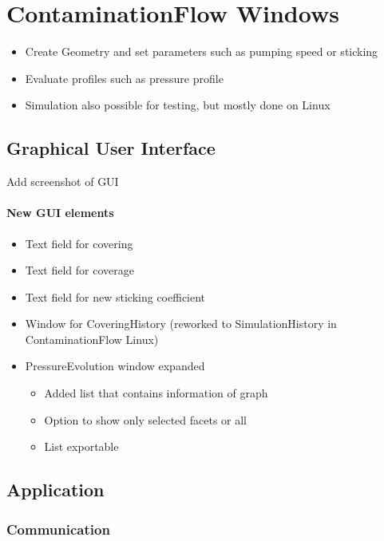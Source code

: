 
\chapter{ContaminationFlow Windows}\label{chapter:Windows}

\begin{itemize}[noitemsep,topsep=0pt]
\item Create Geometry and set parameters such as pumping speed or sticking
\item Evaluate profiles such as pressure profile
\item Simulation also possible for testing, but mostly done on Linux
\end{itemize}

\section{Graphical User Interface}
Add screenshot of GUI

\subsubsection{New GUI elements}
\begin{itemize}[noitemsep,topsep=0pt]
\item Text field for covering
\item Text field for coverage
\item Text field for new sticking coefficient
\item Window for CoveringHistory (reworked to SimulationHistory in ContaminationFlow Linux)
\item PressureEvolution window expanded
	\begin{itemize}[noitemsep,topsep=0pt]
	\item Added list that contains information of graph
	\item Option to show only selected facets or all
	\item List exportable
	\end{itemize}
\end{itemize}

\section{Application}
\subsection{Communication}
